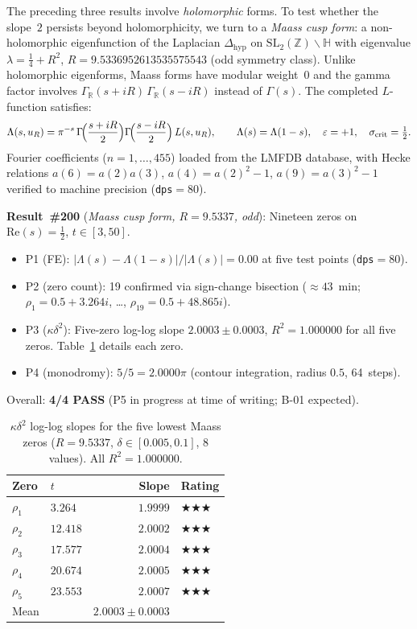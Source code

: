 \documentclass[11pt, a4paper]{article}
\theoremstyle{plain}
\theoremstyle{definition}
\begin{document}
The preceding three results involve \emph{holomorphic} forms.  To test
whether the slope~$2$ persists beyond holomorphicity, we turn to a
\emph{Maass cusp form}: a non-holomorphic eigenfunction of the Laplacian
$\Delta_{\mathrm{hyp}}$ on $\mathrm{SL}_2(\mathbb{Z})\backslash\mathbb{H}$
with eigenvalue $\lambda = \tfrac{1}{4}+R^2$, $R=9.5336952613535575543$
(odd symmetry class).  Unlike holomorphic eigenforms, Maass forms have
modular weight~$0$ and the gamma factor involves
$\Gamma_{\mathbb{R}}(s+iR)\,\Gamma_{\mathbb{R}}(s-iR)$ instead of
$\Gamma(s)$.  The completed $L$-function satisfies:
\[
  \Lambda(s,u_R) = \pi^{-s}\,
  \Gamma\!\Bigl(\frac{s+iR}{2}\Bigr)
  \Gamma\!\Bigl(\frac{s-iR}{2}\Bigr)\,L(s,u_R), \qquad
  \Lambda(s)=\Lambda(1-s), \quad \varepsilon=+1, \quad
  \sigma_{\mathrm{crit}}=\tfrac{1}{2}.
\]
Fourier coefficients ($n=1,\ldots,455$) loaded from the LMFDB database,
with Hecke relations $a(6)=a(2)a(3)$, $a(4)=a(2)^2-1$, $a(9)=a(3)^2-1$
verified to machine precision (\texttt{dps}$=80$).

\medskip
\noindent\textbf{Result~\#200} (\textit{Maass cusp form, $R=9.5337$, odd}):
Nineteen zeros on $\mathrm{Re}(s)=\tfrac{1}{2}$, $t\in[3,50]$.

\begin{itemize}
  \item P1 (FE): $|\Lambda(s)-\Lambda(1-s)|/|\Lambda(s)|=0.00$ at five test
        points (\texttt{dps}$=80$).
  \item P2 (zero count): 19 confirmed via sign-change bisection
        ($\approx 43$~min; $\rho_1=0.5+3.264i$, \ldots, $\rho_{19}=0.5+48.865i$).
  \item P3 ($\kappa\delta^{2}$): Five-zero log-log slope
        $\mathbf{2.0003\pm 0.0003}$, $R^{2}=1.000000$ for all five zeros.
        Table~\ref{tab:maass_kd2} details each zero.
  \item P4 (monodromy): $5/5=2.0000\pi$ (contour integration, radius $0.5$,
        64~steps).
\end{itemize}
Overall: \textbf{4/4 PASS} (P5 in progress at time of writing; B-01 expected).

\begin{table}[ht]
\centering
\caption{$\kappa\delta^{2}$ log-log slopes for the five lowest Maass zeros
  ($R=9.5337$, $\delta\in[0.005,0.1]$, 8 values).  All $R^{2}=1.000000$.}
\label{tab:maass_kd2}
\small
\begin{tabular}{llrl}
\toprule
Zero & $t$ & Slope & Rating \\
\midrule
$\rho_1$ & $3.264$ & $1.9999$ & $\bigstar\bigstar\bigstar$ \\
$\rho_2$ & $12.418$ & $2.0002$ & $\bigstar\bigstar\bigstar$ \\
$\rho_3$ & $17.577$ & $2.0004$ & $\bigstar\bigstar\bigstar$ \\
$\rho_4$ & $20.674$ & $2.0005$ & $\bigstar\bigstar\bigstar$ \\
$\rho_5$ & $23.553$ & $2.0007$ & $\bigstar\bigstar\bigstar$ \\
\midrule
Mean & & $2.0003\pm 0.0003$ & \\
\bottomrule
\end{tabular}
\end{table}
\end{document}
